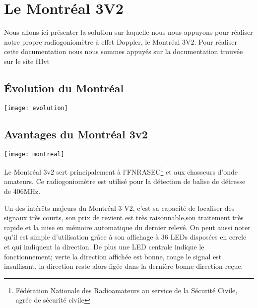 \chapter{Le Montréal 3V2}
\label{montreal}

Nous allons ici présenter la solution sur laquelle nous nous appuyons pour réaliser notre propre radiogoniomètre à effet Doppler, le Montréal 3V2.
Pour réaliser cette documentation nous nous sommes appuyés sur la documentation trouvée sur le site f1lvt \cite{montreal}

\section{Évolution du Montréal}

\texttt{[image: evolution]}

\section{Avantages du Montréal 3v2}

\begin{center}
  \texttt{[image: montreal]}
\end{center}

\parindent=15pt
Le Montréal 3v2 sert principalement à l'FNRASEC\footnote{Fédération Nationale des Radioamateurs au service de la Sécurité Civile, agrée de sécurité civile} et aux chasseurs d'onde amateurs. Ce radiogoniomètre est utilisé pour la détection de balise de détresse de 406MHz.


Un des intérêts majeurs du Montréal 3-V2, c'est sa capacité de localiser des signaux très courts, son prix de revient est très raisonnable,son traitement très rapide et la mise en mémoire automatique du dernier relevé. On peut aussi noter qu'il est simple d'utilisation grâce à son affichage à 36 LEDs disposées en cercle et qui indiquent la direction. De plus une LED centrale indique le fonctionnement; verte la direction affichée est bonne, rouge le signal est insuffisant, la direction reste alors figée dans la dernière bonne direction reçue.


